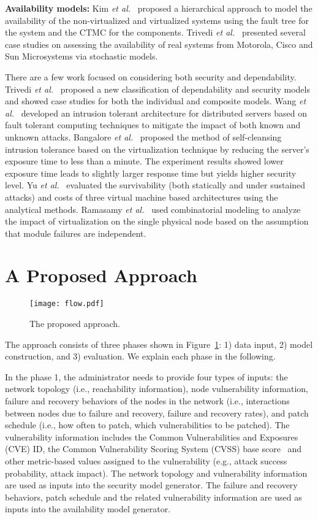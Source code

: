 \documentclass[conference]{IEEEtran}
\begin{document}
\textbf{Availability models:} Kim \emph{et al.}~\cite{Kim2009PRDC} proposed a hierarchical approach to model the availability of the non-virtualized and virtualized systems using the fault tree for the system and the CTMC for the components. Trivedi \emph{et al.}~\cite{Trivedi2013ASMBI} presented several case studies on assessing the availability of real systems from Motorola, Cisco and Sun Microsystems via stochastic models.

There are a few work focused on considering both security and dependability. Trivedi \emph{et al.}~\cite{Trivedi2009DRCN} proposed a new classification of dependability and security models and showed case studies for both the individual and composite models. Wang \emph{et al.}~\cite{Wang2003OASIS} developed an intrusion tolerant architecture for distributed servers based on fault tolerant computing techniques to mitigate the impact of both known and unknown attacks. Bangalore \emph{et al.}~\cite{Bangalore2009DEPEND} proposed the method of self-cleansing intrusion tolerance based on the virtualization technique by reducing the server's exposure time to less than a minute. The experiment results showed lower exposure time leads to slightly larger response time but yields higher security level. Yu \emph{et al.}~\cite{Yu2010SECRYPT} evaluated the survivability (both statically and under sustained attacks) and costs of three virtual machine based architectures using the analytical methods. Ramasamy \emph{et al.}~\cite{Ramasamy2007DSN} used combinatorial modeling to analyze the impact of virtualization on the single physical node based on the assumption that module failures are independent.

\section{A Proposed Approach}
\label{approach}
\begin{figure}[htb]
\centering
\texttt{[image: flow.pdf]}
\caption{The proposed approach.}
\label{fig_flow}
\end{figure}

The approach consists of three phases shown in Figure~\ref{fig_flow}: 1) data input, 2) model construction, and 3) evaluation. We explain each phase in the following.

In the phase 1, the administrator needs to provide four types of inputs: the network topology (i.e., reachability information), node vulnerability information, failure and recovery behaviors of the nodes in the network (i.e., interactions between nodes due to failure and recovery, failure and recovery rates), and patch schedule (i.e., how often to patch, which vulnerabilities to be patched). The vulnerability information includes the Common Vulnerabilities and Exposures (CVE) ID, the Common Vulnerability Scoring System (CVSS) base score~\cite{Gallon2011ARES} and other metric-based values assigned to the vulnerability (e.g., attack success probability, attack impact). The network topology and vulnerability information are used as inputs into the security model generator. The failure and recovery behaviors, patch schedule and the related vulnerability information are used as inputs into the availability model generator.
\end{document}
